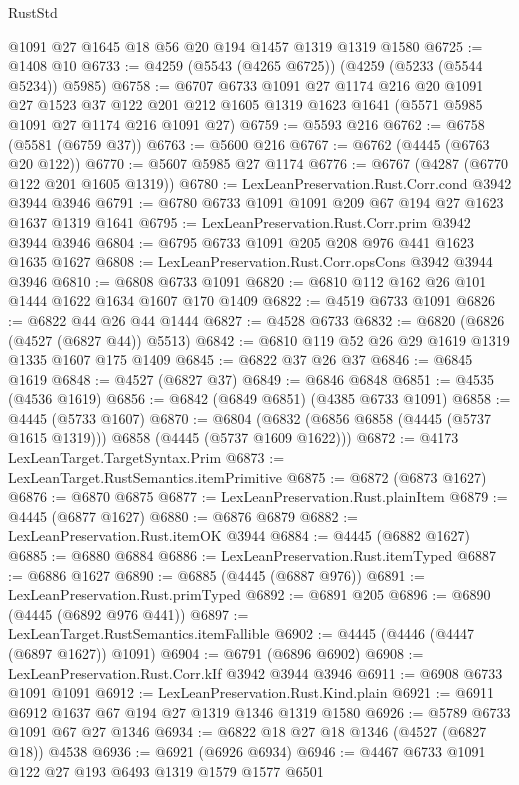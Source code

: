 \begin{lexlean}{RustStd}
\begin{coremodule}
{\begin{coremodule}
{{{{{{{{{{{{{{{{{{{{{{{{{{{{{{{{{{{{{{    @1091
    @27
    @1645
    @18
    @56
    @20
    @194
    @1457
    @1319
    @1319
    @1580
@6725 := @1408 @10
@6733 := @4259 (@5543 (@4265 @6725)) (@4259 (@5233 (@5544 @5234)) @5985)
@6758 := @6707
    @6733
    @1091
    @27
    @1174
    @216
    @20
    @1091
    @27
    @1523
    @37
    @122
    @201
    @212
    @1605
    @1319
    @1623
    @1641
    (@5571 @5985 @1091 @27 @1174 @216 @1091 @27)
@6759 := @5593 @216
@6762 := @6758 (@5581 (@6759 @37))
@6763 := @5600 @216
@6767 := @6762 (@4445 (@6763 @20 @122))
@6770 := @5607 @5985 @27 @1174
@6776 := @6767 (@4287 (@6770 @122 @201 @1605 @1319))
@6780 := LexLeanPreservation.Rust.Corr.cond @3942 @3944 @3946
@6791 := @6780 @6733 @1091 @1091 @209 @67 @194 @27 @1623 @1637 @1319 @1641
@6795 := LexLeanPreservation.Rust.Corr.prim @3942 @3944 @3946
@6804 := @6795 @6733 @1091 @205 @208 @976 @441 @1623 @1635 @1627
@6808 := LexLeanPreservation.Rust.Corr.opsCons @3942 @3944 @3946
@6810 := @6808 @6733 @1091
@6820 := @6810 @112 @162 @26 @101 @1444 @1622 @1634 @1607 @170 @1409
@6822 := @4519 @6733 @1091
@6826 := @6822 @44 @26 @44 @1444
@6827 := @4528 @6733
@6832 := @6820 (@6826 (@4527 (@6827 @44)) @5513)
@6842 := @6810 @119 @52 @26 @29 @1619 @1319 @1335 @1607 @175 @1409
@6845 := @6822 @37 @26 @37
@6846 := @6845 @1619
@6848 := @4527 (@6827 @37)
@6849 := @6846 @6848
@6851 := @4535 (@4536 @1619)
@6856 := @6842 (@6849 @6851) (@4385 @6733 @1091)
@6858 := @4445 (@5733 @1607)
@6870 := @6804 (@6832 (@6856 @6858 (@4445 (@5737 @1615 @1319))) @6858 (@4445 (@5737 @1609 @1622)))
@6872 := @4173 LexLeanTarget.TargetSyntax.Prim
@6873 := LexLeanTarget.RustSemantics.itemPrimitive
@6875 := @6872 (@6873 @1627)
@6876 := @6870 @6875
@6877 := LexLeanPreservation.Rust.plainItem
@6879 := @4445 (@6877 @1627)
@6880 := @6876 @6879
@6882 := LexLeanPreservation.Rust.itemOK @3944
@6884 := @4445 (@6882 @1627)
@6885 := @6880 @6884
@6886 := LexLeanPreservation.Rust.itemTyped
@6887 := @6886 @1627
@6890 := @6885 (@4445 (@6887 @976))
@6891 := LexLeanPreservation.Rust.primTyped
@6892 := @6891 @205
@6896 := @6890 (@4445 (@6892 @976 @441))
@6897 := LexLeanTarget.RustSemantics.itemFallible
@6902 := @4445 (@4446 (@4447 (@6897 @1627)) @1091)
@6904 := @6791 (@6896 @6902)
@6908 := LexLeanPreservation.Rust.Corr.kIf @3942 @3944 @3946
@6911 := @6908 @6733 @1091 @1091
@6912 := LexLeanPreservation.Rust.Kind.plain
@6921 := @6911 @6912 @1637 @67 @194 @27 @1319 @1346 @1319 @1580
@6926 := @5789 @6733 @1091 @67 @27 @1346
@6934 := @6822 @18 @27 @18 @1346 (@4527 (@6827 @18)) @4538
@6936 := @6921 (@6926 @6934)
@6946 := @4467 @6733 @1091 @122 @27 @193 @6493 @1319 @1579 @1577 @6501
}}}}}}}}}}}}}}}}}}}}}}}}}}}}}}}}}}}}}}
\end{coremodule}}
\end{coremodule}
\end{lexlean}
